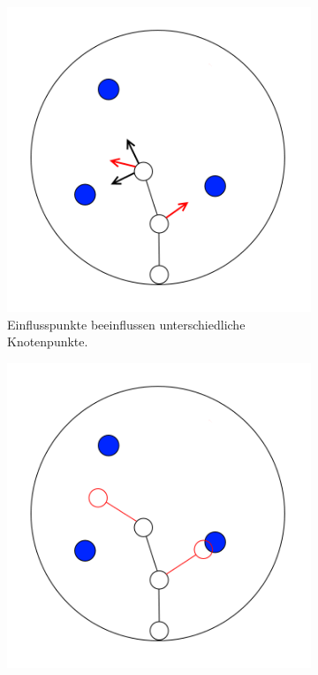 \begin{figure} [hbtp]
	\begin{subfigure}[t]{.3\textwidth}
		\centering
		\includegraphics[width=\linewidth]{images/SCA_Basic7.png}
		\caption{Einflusspunkte beeinflussen unterschiedliche Knotenpunkte.}
		\label{subfig:SCA_Basic7}
	\end{subfigure}
	\hspace{.03\textwidth}
	\begin{subfigure}[t]{.3\textwidth}
		\centering
		\includegraphics[width=\linewidth]{images/SCA_Basic8.png}

\end{subfigure}
\end{figure}
